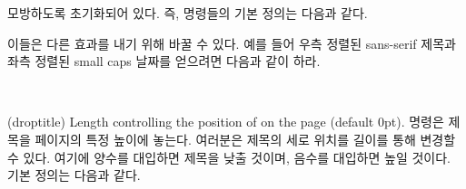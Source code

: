 모방하도록 초기화되어 있다.
즉, 명령들의 기본 정의는 다음과 같다.
\begin{lcode}
\pretitle{\begin{center}\LARGE}
\posttitle{\par\end{center}\vskip 0.5em}
\postauthor{\end{tabular}\par\end{center}}
\predate{\begin{center}\large}
\postdate{\par\end{center}}
\end{lcode}

이들은 다른 효과를 내기 위해 바꿀 수 있다.
예를 들어 우측 정렬된 sans-serif 제목과 좌측 정렬된 small caps 날짜를 얻으려면
다음과 같이 하라.
\begin{lcode}
\pretitle{\begin{flushright}\LARGE\sffamily}
\posttitle{\par\end{flushright}\vskip 0.5em}
\predate{\begin{flushleft}\large\scshape}
\postdate{\par\end{flushleft}}
\end{lcode}

\begin{syntax}
\lnc{\droptitle} \\
\end{syntax}
\glossary(droptitle)%
  {}%
  {Length controlling the position of  on the page (default 0pt).}
\cmd{\maketitle} 명령은 제목을 페이지의 특정 높이에 놓는다.
여러분은 제목의 세로 위치를 \lnc{\droptitle} 길이를 통해 변경할 수 있다.
여기에 양수를 대입하면 제목을 낮출 것이며, 음수를 대입하면 높일 것이다.
기본 정의는 다음과 같다.
\begin{lcode}
\setlength{\droptitle}{0pt}
\end{lcode}

